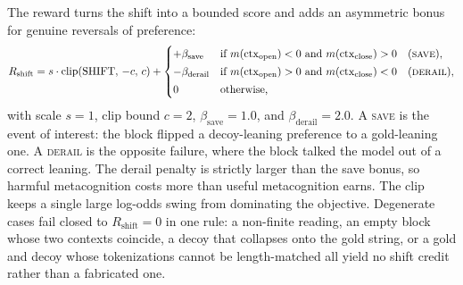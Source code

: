 The reward turns the shift into a bounded score and adds an asymmetric bonus for
genuine reversals of preference:
\begin{equation}
R_{\mathrm{shift}}
= s \cdot \mathrm{clip}(\mathrm{SHIFT},\, -c,\, c)
+
\begin{cases}
+\beta_{\mathrm{save}}
  & \text{if } m(\mathrm{ctx}_{\mathrm{open}}) < 0
    \text{ and } m(\mathrm{ctx}_{\mathrm{close}}) > 0
    \quad(\textsc{save}),\\[2pt]
-\beta_{\mathrm{derail}}
  & \text{if } m(\mathrm{ctx}_{\mathrm{open}}) > 0
    \text{ and } m(\mathrm{ctx}_{\mathrm{close}}) < 0
    \quad(\textsc{derail}),\\[2pt]
0 & \text{otherwise,}
\end{cases}
\label{eq:reward}
\end{equation}
with scale $s = 1$, clip bound $c = 2$, $\beta_{\mathrm{save}} = 1.0$, and
$\beta_{\mathrm{derail}} = 2.0$. A \textsc{save} is the event of interest: the
block flipped a decoy-leaning preference to a gold-leaning one. A \textsc{derail}
is the opposite failure, where the block talked the model out of a correct
leaning. The derail penalty is strictly larger than the save bonus, so harmful
metacognition costs more than useful metacognition earns. The clip keeps a single
large log-odds swing from dominating the objective. Degenerate cases fail closed
to $R_{\mathrm{shift}} = 0$ in one rule: a non-finite reading, an empty block
whose two contexts coincide, a decoy that collapses onto the gold string, or a
gold and decoy whose tokenizations cannot be length-matched all yield no shift
credit rather than a fabricated one.

